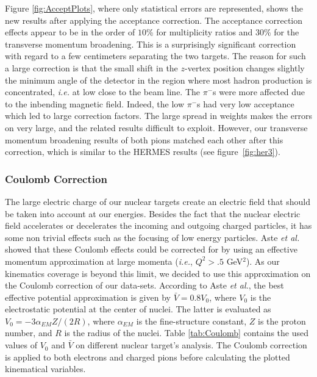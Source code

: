 Figure \ref{fig:AcceptPlots}, where only statistical errors are 
represented, shows the new results after applying the acceptance correction.
The acceptance correction effects appear to be in the order of $10$\% for 
multiplicity ratios and $30$\% for the transverse momentum broadening. This is a surprisingly significant correction with regard to a few centimeters separating the two targets. The reason for such a large correction is that the small shift in the $z$-vertex position changes slightly the minimum angle of the detector in the region where most hadron production is concentrated, {\it i.e.} at low \pt close to the beam line. The $\pi^-$s were more affected due to the inbending magnetic field. Indeed, the low \pt $\pi^-$s had very low acceptance which led to large correction factors. The large spread in weights makes the errors on \dpt very large, and the related results difficult to exploit. However, our transverse momentum broadening 
results of both pions matched each other after this correction, which is similar 
to the HERMES results (see figure~\ref{fig:her3}).

\subsubsection{Coulomb Correction}
\label{CCor}

The large electric charge of our nuclear targets create an electric field that 
should be taken into account at our energies. Besides the fact that the nuclear 
electric field accelerates or decelerates the incoming and outgoing charged 
particles, it has some non trivial effects such as the focusing of low energy 
particles. Aste {\it et al.}~\cite{Aste:2005wc} showed that these Coulomb 
effects could be corrected for by using an effective momentum approximation at 
large momenta ({\it i.e.}, $Q^2>.5$ GeV$^2$). As our kinematics coverage is 
beyond this limit, we decided to use this approximation on the Coulomb 
correction of our data-sets. According to Aste {\it et al.}, the best effective 
potential approximation is given by $\bar V= 0.8 V_0$, where $V_0$ is the 
electrostatic potential at the center of nuclei. The latter is evaluated as 
$V_0= -3 \alpha_{EM} Z / (2 R)$, where $\alpha_{EM}$ is the fine-structure 
constant, $Z$ is the proton number, and $R$ is the radius of the nuclei. Table 
\ref{tab:Coulomb} contains the used values of $V_0$ and $\bar V$ on different 
nuclear target's analysis. The Coulomb correction is applied to both electrons 
and charged pions before calculating the plotted kinematical variables.

